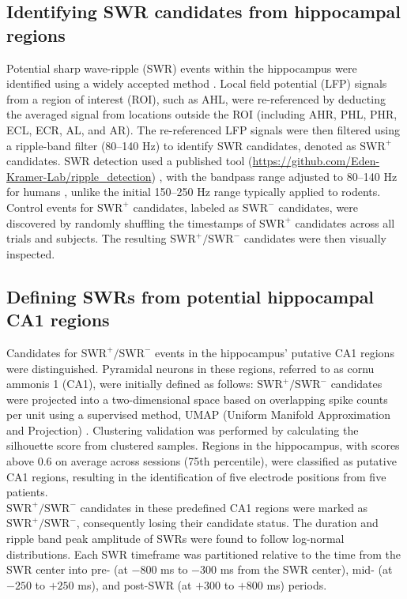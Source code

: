 \subsection{Identifying SWR candidates from hippocampal regions}
Potential sharp wave-ripple (SWR) events within the hippocampus were identified using a widely accepted method \cite{liu_consensus_2022}. Local field potential (LFP) signals from a region of interest (ROI), such as AHL, were re-referenced by deducting the averaged signal from locations outside the ROI (including AHR, PHL, PHR, ECL, ECR, AL, and AR). The re-referenced LFP signals were then filtered using a ripple-band filter (80--140 Hz) to identify SWR candidates, denoted as $\textrm{SWR}^+$ candidates. SWR detection used a published tool (\url{https://github.com/Eden-Kramer-Lab/ripple_detection}) \cite{kay_hippocampal_2016}, with the bandpass range adjusted to 80--140 Hz for humans \cite{norman_hippocampal_2019, norman_hippocampal_2021}, unlike the initial 150--250 Hz range typically applied to rodents.
\\
\indent
Control events for $\textrm{SWR}^+$ candidates, labeled as $\textrm{SWR}^-$ candidates, were discovered by randomly shuffling the timestamps of $\textrm{SWR}^+$ candidates across all trials and subjects. The resulting $\textrm{SWR}^+/\textrm{SWR}^-$ candidates were then visually inspected.

\subsection{Defining SWRs from potential hippocampal CA1 regions}
Candidates for $\textrm{SWR}^+/\textrm{SWR}^-$ events in the hippocampus' putative CA1 regions were distinguished. Pyramidal neurons in these regions, referred to as cornu ammonis 1 (CA1), were initially defined as follows: $\textrm{SWR}^+/\textrm{SWR}^-$ candidates were projected into a two-dimensional space based on overlapping spike counts per unit using a supervised method, UMAP (Uniform Manifold Approximation and Projection) \cite{mcinnes_umap_2018}. Clustering validation was performed by calculating the silhouette score \cite{rousseeuw_silhouettes_1987} from clustered samples. Regions in the hippocampus, with scores above 0.6 on average across sessions (75th percentile), were classified as putative CA1 regions, resulting in the identification of five electrode positions from five patients.
\\
\indent
$\textrm{SWR}^+/\textrm{SWR}^-$ candidates in these predefined CA1 regions were marked as $\textrm{SWR}^+/\textrm{SWR}^-$, consequently losing their candidate status. The duration and ripple band peak amplitude of SWRs were found to follow log-normal distributions. Each SWR timeframe was partitioned relative to the time from the SWR center into pre- (at $-800$ ms to $-300$ ms from the SWR center), mid- (at $-250$ to $+250$ ms), and post-SWR (at $+300$ to $+800$ ms) periods.

